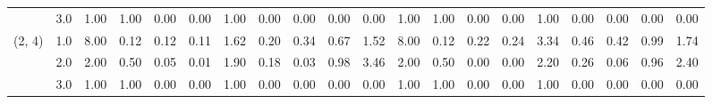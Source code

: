 \begin{tabular}{llrrrrrrrrrrrrrrrrrr}
       & 3.0 &               1.00 &                     1.00 &                                 0.00 &                             0.00 &                           1.00 &                                               0.00 &                                            0.00 &                                            0.00 &                                        0.00 &               1.00 &                     1.00 &                                 0.00 &                             0.00 &                           1.00 &                                               0.00 &                                            0.00 &                                            0.00 &                                        0.00 \\
(2, 4) & 1.0 &               8.00 &                     0.12 &                                 0.12 &                             0.11 &                           1.62 &                                               0.20 &                                            0.34 &                                            0.67 &                                        1.52 &               8.00 &                     0.12 &                                 0.22 &                             0.24 &                           3.34 &                                               0.46 &                                            0.42 &                                            0.99 &                                        1.74 \\
       & 2.0 &               2.00 &                     0.50 &                                 0.05 &                             0.01 &                           1.90 &                                               0.18 &                                            0.03 &                                            0.98 &                                        3.46 &               2.00 &                     0.50 &                                 0.00 &                             0.00 &                           2.20 &                                               0.26 &                                            0.06 &                                            0.96 &                                        2.40 \\
       & 3.0 &               1.00 &                     1.00 &                                 0.00 &                             0.00 &                           1.00 &                                               0.00 &                                            0.00 &                                            0.00 &                                        0.00 &               1.00 &                     1.00 &                                 0.00 &                             0.00 &                           1.00 &                                               0.00 &                                            0.00 &                                            0.00 &                                        0.00 \\

\end{tabular}
